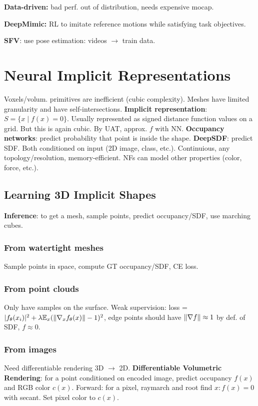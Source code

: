 \documentclass[11pt,landscape,a4paper,fleqn]{article}
\newcommand{\E}{\mathbb{E}}
\begin{document}
\begin{multicols*}{4}
\textbf{Data-driven:}
bad perf. out of distribution,
needs expensive mocap.

\textbf{DeepMimic:} RL to imitate reference motions while satisfying task objectives.

\textbf{SFV}: use pose estimation: videos $\to$ train data.

\section{Neural Implicit Representations}

Voxels/volum. primitives are inefficient (cubic complexity).
Meshes have limited granularity and have self-intersections.
\textbf{Implicit representation}: $S = \{x \mid f(x) = 0\}$.
Usually represented as signed distance function values on a grid.
But this is again cubic.
By UAT, approx. $f$ with NN.
\textbf{Occupancy networks}: predict probability that point is inside the shape.
\textbf{DeepSDF}: predict SDF.
Both conditioned on input (2D image, class, etc.).
Continuious, any topology/resolution, memory-efficient.
NFs can model other properties (color, force, etc.).

\subsection{Learning 3D Implicit Shapes}

\textbf{Inference}: to get a mesh, sample points, predict occupancy/SDF, use marching cubes.

\subsubsection{From watertight meshes}
Sample points in space, compute GT occupancy/SDF, CE loss.

\subsubsection{From point clouds} Only have samples on the surface.
Weak supervision: loss = $|f_\theta(x_i)|^2 + \lambda \E_x(\norm{\nabla_x f_\theta(x)} - 1)^2$,
edge points should have $\norm{\nabla f} \approx 1$ by def. of SDF, $f \approx 0$.

\subsubsection{From images} Need differentiable rendering 3D $\to$ 2D.
\textbf{Differentiable Volumetric Rendering}: for a point conditioned on encoded image,
predict occupancy $f(x)$ and RGB color $c(x)$.
Forward: for a pixel, raymarch and root find $x : f(x) = 0$ with secant. Set pixel color to $c(x)$.

\end{multicols*}
\end{document}
